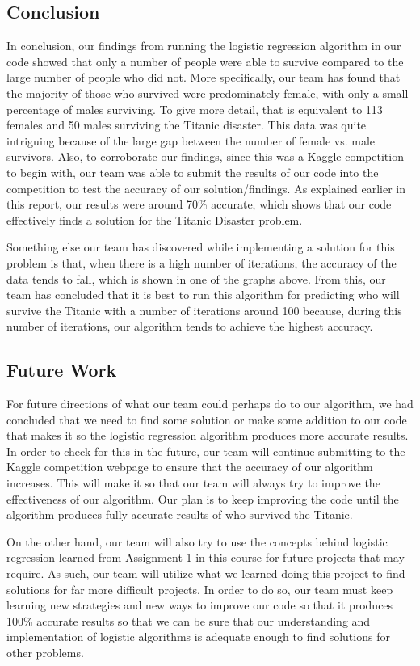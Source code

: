\documentclass{IEEE}
\begin{document}
\subsection{Conclusion}
In conclusion, our findings from running the logistic regression algorithm in our code showed that only a number of people were able to survive compared to the large number of people who did not. More specifically, our team has found that the majority of those who survived were predominately female, with only a small percentage of males surviving. To give more detail, that is equivalent to 113 females and 50 males surviving the Titanic disaster.  This data was quite intriguing because of the large gap between the number of female vs. male survivors. Also, to corroborate our findings, since this was a Kaggle competition to begin with, our team was able to submit the results of our code into the competition to test the accuracy of our solution/findings. As explained earlier in this report, our results were around 70\% accurate, which shows that our code effectively finds a solution for the Titanic Disaster problem.

Something else our team has discovered while implementing a solution for this problem is that, when there is a high number of iterations, the accuracy of the data tends to fall, which is shown in one of the graphs above. From this, our team has concluded that it is best to run this algorithm for predicting who will survive the Titanic with a number of iterations around 100 because, during this number of iterations, our algorithm tends to achieve the highest accuracy.
\subsection{Future Work}
For future directions of what our team could perhaps do to our algorithm, we had concluded that we need to find some solution or make some addition to our code that makes it so the logistic regression algorithm produces more accurate results. In order to check for this in the future, our team will continue submitting to the Kaggle competition webpage to ensure that the accuracy of our algorithm increases. This will make it so that our team will always try to improve the effectiveness of our algorithm. Our plan is to keep improving the code until the algorithm produces fully accurate results of who survived the Titanic.

On the other hand, our team will also try to use the concepts behind logistic regression learned from Assignment 1 in this course for future projects that may require. As such, our team will utilize what we learned doing this project to find solutions for far more difficult projects. In order to do so, our team must keep learning new strategies and new ways to improve our code so that it produces 100\% accurate results so that we can be sure that our understanding and implementation of logistic algorithms is adequate enough to find solutions for other problems.
\end{document}
